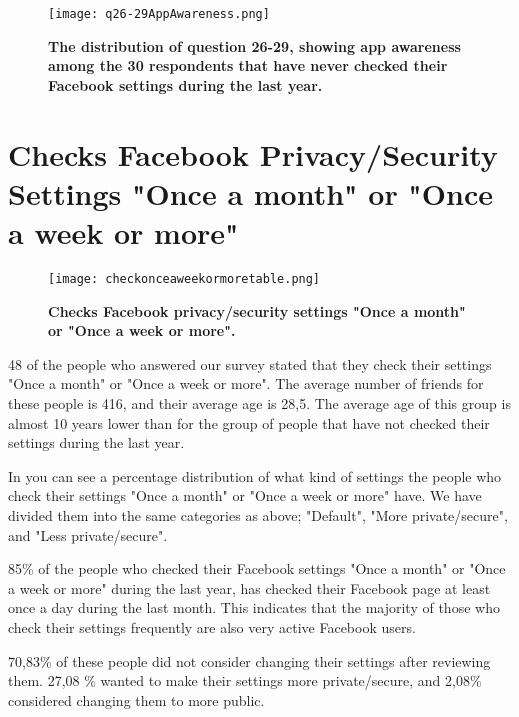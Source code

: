 \begin{figure}[h!]
\centering
\texttt{[image: q26-29AppAwareness.png]}
\caption[The distribution of question 26-29, showing app awareness among the 30 respondents that have never checked their Facebook settings during the last year]{\textbf{The distribution of question 26-29, showing app awareness among the 30 respondents that have never checked their Facebook settings during the last year.}} 
\label{fig:appawarenessneverchecked}
\end{figure}


\section{Checks Facebook Privacy/Security Settings "Once a month" or "Once a week or more"}

\begin{figure}[h!]
\centering
\texttt{[image: checkonceaweekormoretable.png]}
\caption[Checks Facebook privacy/security settings "Once a month" or "Once a week or more"]{\textbf{Checks Facebook privacy/security settings "Once a month" or "Once a week or more".}} 
\label{fig:onceaweekormore}
\end{figure}

48 of the people who answered our survey stated that they check their settings "Once a month" or "Once a week or more". The average number of friends for these people is 416, and their average age is 28,5. The average age of this group is almost 10 years lower than for the group of people that have not checked their settings during the last year.

In  you can see a percentage distribution of what kind of settings the people who check their settings "Once a month" or "Once a week or more" have. We have divided them into the same categories as above; "Default", "More private/secure", and "Less private/secure".  

85\% of the people who checked their Facebook settings "Once a month" or "Once a week or more" during the last year, has checked their Facebook page at least once a day during the last month. This indicates that the majority of those who check their settings frequently are also very active Facebook users. 

70,83\% of these people did not consider changing their settings after reviewing them. 27,08 \% wanted to make their settings more private/secure, and 2,08\% considered changing them to more public. 



